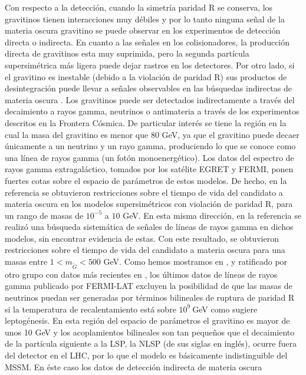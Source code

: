 Con respecto a la detección, cuando la simetría paridad R se conserva,
los gravitinos tienen interacciones muy débiles y por lo tanto ninguna
señal de la materia oscura gravitino se puede observar en los
experimentos de detección directa o indirecta. En cuanto a las señales
en los colisionadores, la producción directa de gravitinos esta muy
suprimida, pero la segunda partícula supersimétrica más ligera puede
dejar rastros en los detectores. Por otro lado, si el gravitino es
inestable (debido a la violación de paridad R) sus productos de
desintegración puede llevar a señales observables en las búsquedas
indirectas de materia oscura
\cite{Bertone:2007aw,Ibarra:2007wg,Covi:2008jy,Ibarra:2008qg}. Los
gravitinos puede ser detectados indirectamente a través del
decaimiento a rayos gamma, neutrinos o antimateria a través de los
experimentos descritos en la Frontera Cósmica. De particular interés
se tiene la región en la cual la masa del gravitino es menor que $80$
GeV, ya que el gravitino puede decaer únicamente a un neutrino y un
rayo gamma, produciendo lo que se conoce como una línea de rayos gamma
(un fotón monoenergético). Los datos del espectro de rayos gamma
extragaláctico, tomados por los satélite EGRET y FERMI, ponen fuertes
cotas sobre el espacio de parámetros de estos modelos. De hecho, en la
referencia \cite{Yuksel:2007dr} se obtuvieron restricciones sobre el
tiempo de vida del candidato a materia oscura en los modelos
supersimétricos con violación de paridad R, para un rango de masas de
$10^{-5}$ a $10$ GeV. En esta misma dirección, en la referencia
\cite{Vertongen:2011mu} se realizó una búsqueda sistemática de señales
de líneas de rayos gamma en dichos modelos, sin encontrar evidencia de
estas. Con este resultado, se obtuvieron restricciones sobre el tiempo
de vida del candidato a materia oscura para una masas entre
$1<m_{\tilde G}< 500$ GeV. Como hemos mostramos en \cite{Choi:2010jt},
y ratificado por otro grupo con datos más recientes en
\cite{Garny:2010eg}, los últimos datos de líneas de rayos gamma
publicado por FERMI-LAT excluyen la posibilidad de que las masas de
neutrinos puedan ser generadas por términos bilineales de ruptura de
paridad R si la temperatura de recalentamiento está sobre $10^9\ $GeV
como sugiere leptogénesis.  En esta región del espacio de parámetros
el gravitino es mayor de unos 10 GeV y los acoplamientos bilineales
son tan pequeños que el decaimiento de la partícula siguiente a la
LSP, la NLSP (de sus siglas en inglés), ocurre fuera del detector en
el LHC, por lo que el modelo es básicamente indistinguible del
MSSM. En éste caso los datos de detección indirecta de materia oscura
